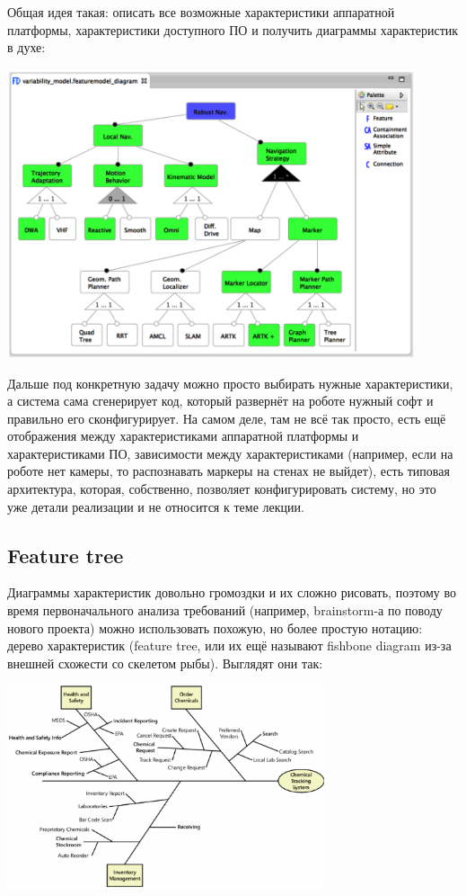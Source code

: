 \documentclass{../../text-style}
\begin{document}
Общая идея такая: описать все возможные характеристики аппаратной платформы, характеристики доступного ПО и получить диаграммы характеристик в духе:

\begin{center}
    \includegraphics[width=0.9\textwidth]{featureDiagramExample.png}
\end{center}

Дальше под конкретную задачу можно просто выбирать нужные характеристики, а система сама сгенерирует код, который развернёт на роботе нужный софт и правильно его сконфигурирует. На самом деле, там не всё так просто, есть ещё отображения между характеристиками аппаратной платформы и характеристиками ПО, зависимости между характеристиками (например, если на роботе нет камеры, то распознавать маркеры на стенах не выйдет), есть типовая архитектура, которая, собственно, позволяет конфигурировать систему, но это уже детали реализации и не относится к теме лекции.

\subsection{Feature tree}

Диаграммы характеристик довольно громоздки и их сложно рисовать, поэтому во время первоначального анализа требований (например, brainstorm-а по поводу нового проекта) можно использовать похожую, но более простую нотацию: дерево характеристик (feature tree, или их ещё называют fishbone diagram из-за внешней схожести со скелетом рыбы). Выглядят они так:

\begin{center}
    \includegraphics[width=0.7\textwidth]{featureTree.png}
\end{center}
\end{document}
